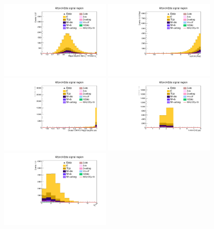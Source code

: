 \begin{figure}[tbp]
  \begin{center}
    \includegraphics[width=0.48\textwidth]{figures/wlnhbb2016/resolved/WenWHSR_pTBalanceDijetW.pdf}
    \includegraphics[width=0.48\textwidth]{figures/wlnhbb2016/resolved/WenWHSR_deltaPhiVH.pdf}
    \includegraphics[width=0.48\textwidth]{figures/wlnhbb2016/resolved/WenWHSR_bDiscrMax.pdf}
    \includegraphics[width=0.48\textwidth]{figures/wlnhbb2016/resolved/WenWHSR_nJet.pdf}
    \includegraphics[width=0.48\textwidth]{figures/wlnhbb2016/resolved/WenWHSR_nSoft5.pdf}

\end{center}
\end{figure}
